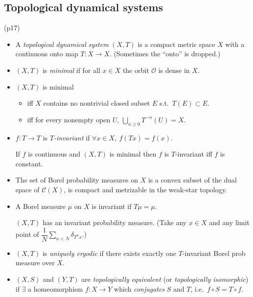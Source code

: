\documentclass[a4paper,11pt]{amsart}
\begin{document}
\subsection{Topological dynamical systems} (p17)

\begin{itemize}
\item A \emph{topological dynamical system} $(X,T) $ is a compact metric space $ X $  with a continuous onto map $ T:X\to X $. (Sometimes the ``onto'' is dropped.)

\item $(X,T) $  is \emph{minimal} if for all $ x\in X $ the orbit $ \mathcal{O} $ is dense  in $ X $.

\item   $(X,T) $  is minimal  
\begin{itemize}
\item iff $X$  contains no nontrivial closed subset $ E $ s.t.\ $ T(E)\subset E $.
\item iff for every nonempty open $ U  $, $ \bigcup _{n\geq 0} T^{-n}(U) = X$.
\end{itemize}

\item $  f:T\to T $ is \emph{$ T $-invariant} if $ \forall x\in X,\ f(Tx)=f(x) $.

If $ f $ is continuous and  $(X,T) $  is minimal  then $ f $ is $ T $-invariant iff $ f $ is constant.

\item The set of Borel probability  measures on $ X$ is a convex subset of the dual space of $ \mathcal{C} (X) $, is compact and metrizable
in the weak-star topology.

\item  A Borel measure $ \mu $ on $ X$ is invariant if $ T\mu = \mu $.

$(X,T) $ has an invariant probability measure.  (Take any $ x\in X $ and any limit point of 
$ \dfrac{1}{N}\sum_{n< N} \delta_{T^nx} $.)

\item $ (X,T) $ is \emph{uniquely ergodic} if there exists exactly one $ T$-invariant Borel prob measure over $ X $.

\item  $ (X,S) $ and $ (Y,T) $ are \emph{topologically equivalent} (or \emph{topologically isomorphic})  if $  \exists $ a homeomorphism $ f:X\to Y $ which \emph{conjugates} $ S $ and $ T $, i.e.\ $ f \circ S = T \circ f $.



\end{itemize}
\end{document}
